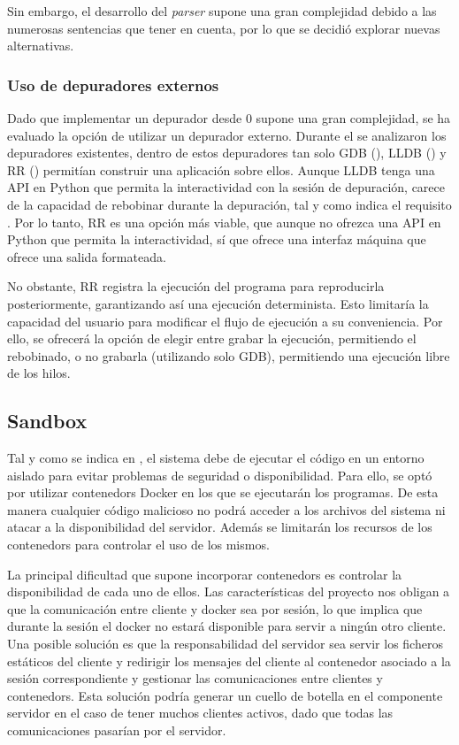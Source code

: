 Sin embargo, el desarrollo del \textit{\gls{parser}} supone una gran complejidad debido a las numerosas \glspl{sentencia} que tener en cuenta, por lo que se decidió explorar nuevas alternativas.

\subsubsection{Uso de depuradores externos} \label{subsec:depuradores-externos}

Dado que implementar un depurador desde 0 supone una gran complejidad, se ha evaluado la opción de utilizar un depurador externo. Durante el  se analizaron los depuradores existentes, dentro de estos depuradores tan solo GDB (), LLDB () y RR () permitían construir una aplicación sobre ellos. Aunque LLDB tenga una \gls{API} en Python que permita la interactividad con la sesión de depuración, carece de la capacidad de rebobinar durante la depuración, tal y como indica el requisito . Por lo tanto, RR es una opción más viable, que aunque no ofrezca una \gls{API} en Python que permita la interactividad, sí que ofrece una interfaz máquina que ofrece una salida formateada.

No obstante, RR registra la ejecución del programa para reproducirla posteriormente, garantizando así una ejecución determinista. Esto limitaría la capacidad del usuario para modificar el flujo de ejecución a su conveniencia. Por ello, se ofrecerá la opción de elegir entre grabar la ejecución, permitiendo el rebobinado, o no grabarla (utilizando solo GDB), permitiendo una ejecución libre de los \glspl{hilo}.
    
\subsection{Sandbox} \label{subsec:sandbox}

Tal y como se indica en , el sistema debe de ejecutar el código en un entorno aislado para evitar problemas de seguridad o disponibilidad. Para ello, se optó por utilizar \glspl{contenedor} Docker en los que se ejecutarán los programas. De esta manera cualquier código malicioso no podrá acceder a los archivos del sistema ni atacar a la disponibilidad del servidor. Además se limitarán los recursos de los \glspl{contenedor} para controlar el uso de los mismos.

La principal dificultad que supone incorporar \glspl{contenedor} es controlar la disponibilidad de cada uno de ellos. Las características del proyecto nos obligan a que la comunicación entre cliente y docker sea por sesión, lo que implica que durante la sesión el docker no estará disponible para servir a ningún otro cliente. Una posible solución es que la responsabilidad del servidor sea servir los ficheros estáticos del cliente y redirigir los mensajes del cliente al contenedor asociado a la sesión correspondiente y gestionar las comunicaciones entre clientes y \glspl{contenedor}. Esta solución podría generar un cuello de botella en el componente servidor en el caso de tener muchos clientes activos, dado que todas las comunicaciones pasarían por el servidor.

